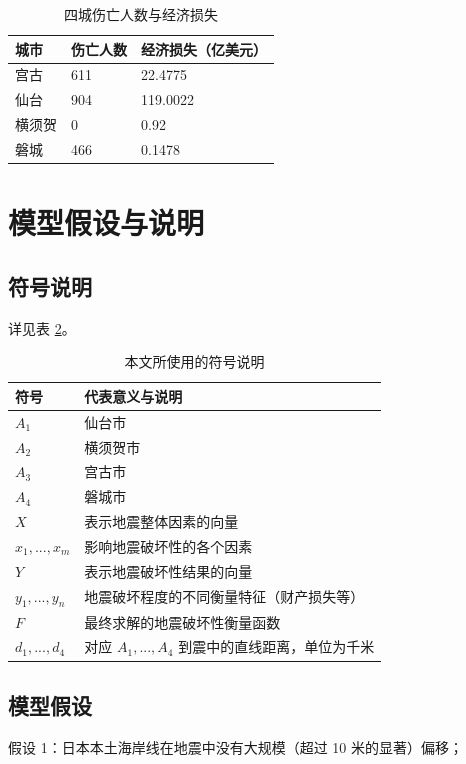 \documentclass[UTF8]{ctexart}
\begin{document}
\begin{table}[htbp]
  \centering
  \caption{四城伤亡人数与经济损失}
  \label{tab:earthquakeResults}
  \begin{tabular}{lll}
    \hline
    城市  & 伤亡人数 & 经济损失（亿美元） \\ \hline
    宫古  & 611  & 22.4775   \\
    仙台  & 904  & 119.0022  \\
    横须贺 & 0    & 0.92      \\
    磐城  & 466  & 0.1478    \\ \hline
  \end{tabular}
\end{table}

\section{模型假设与说明}
\subsection{符号说明}
详见表 \ref{tab:symbolDescription}。
\begin{table}[htbp]
  \caption{本文所使用的符号说明}
  \label{tab:symbolDescription}
  \centering
  \begin{tabular}{@{}ll@{}}
    \toprule
    符号 & 代表意义与说明 \\ \midrule
    $A_1$ & 仙台市 \\
    $A_2$ & 横须贺市 \\
    $A_3$ & 宫古市 \\
    $A_4$ & 磐城市 \\
    $X$ & 表示地震整体因素的向量 \\
    $x_1, ..., x_m$ & 影响地震破坏性的各个因素 \\
    $Y$ & 表示地震破坏性结果的向量 \\
    $y_1, ..., y_n$ & 地震破坏程度的不同衡量特征（财产损失等）\\
    $F$ & 最终求解的地震破坏性衡量函数 \\
    $d_1, ..., d_4$ & 对应 $A_1, ..., A_4$ 到震中的直线距离，单位为千米 \\ \bottomrule
  \end{tabular}
\end{table}

\subsection{模型假设}
假设 1：日本本土海岸线在地震中没有大规模（超过 10 米的显著）偏移；\cite{NASA2011JapanMoving}
\end{document}
